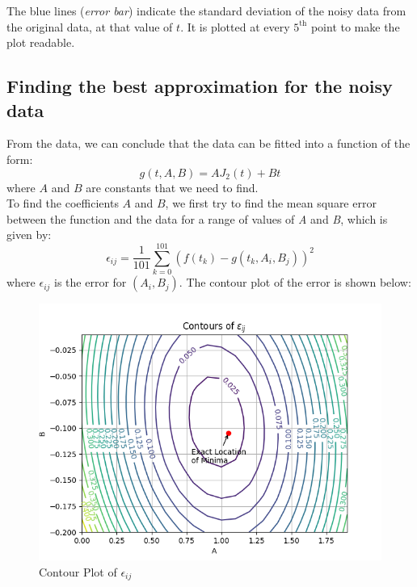 \documentclass[11pt, a4paper]{article}
\begin{document}
            The blue lines (\textit{error bar}) indicate the standard deviation of the noisy data from the original data, at that value of $t$. It is plotted at every $5^\text{th}$ point to make the plot readable.

        \subsection{Finding the best approximation for the noisy data}
            From the data, we can conclude that the data can be fitted into a function of the form:
            \begin{equation}
                g(t, A, B) = AJ_2(t)+Bt
            \end{equation}
            where $A$ and $B$ are constants that we need to find.\\

            To find the coefficients $A$ and $B$, we first try to find the mean square error between the function and the data for a range of values of \textit{A} and \textit{B}, which is given by:
            \begin{equation}
                \epsilon_{ij} = \frac{1}{101}\sum_{k=0}^{101}(f(t_k) - g(t_k, A_i, B_j))^2
            \end{equation}
            where $\epsilon_{ij}$ is the error for $(A_i,B_j)$. The contour plot of the error is shown below:
            \begin{figure}[H]
                \centering
                \includegraphics[scale=0.5]{Fig 2.png}  %
                \caption{Contour Plot of $\epsilon_{ij}$}
                \label{fig:contourPlot}
            \end{figure}
\end{document}
